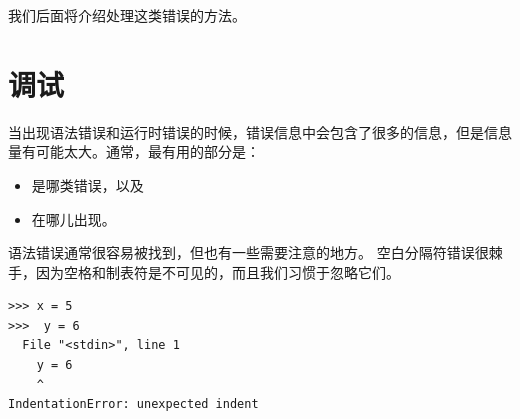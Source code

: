 {{{{我们后面将介绍处理这类错误的方法。
  


\section{调试}
\label{whitespace}

  
  


当出现语法错误和运行时错误的时候，错误信息中会包含了很多的信息，但是信息量有可能太大。通常，最有用的部分是：


\begin{itemize}

\item 是哪类错误，以及

\item 在哪儿出现。

\end{itemize}


语法错误通常很容易被找到，但也有一些需要注意的地方。
空白分隔符错误很棘手，因为空格和制表符是不可见的，而且我们习惯于忽略它们。

\begin{lstlisting}
>>> x = 5
>>>  y = 6
  File "<stdin>", line 1
    y = 6
    ^
IndentationError: unexpected indent
\end{lstlisting}

%

}}}}
